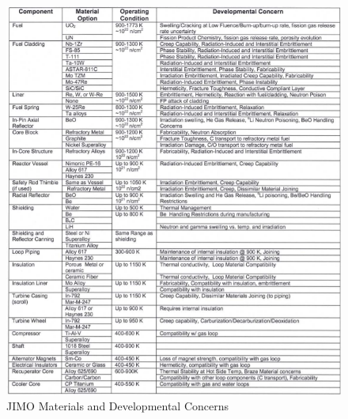 \documentclass{article}
\begin{document}
\begin{figure}[]
	\centering
	\includegraphics[height=0.85\textheight]{fig/appT}
	\caption[JIMO Materials and Developmental Concerns]{JIMO Materials and Developmental Concerns~\cite{wollman2006prometheus}}
	\label{appT}
\end{figure}
\end{document}
